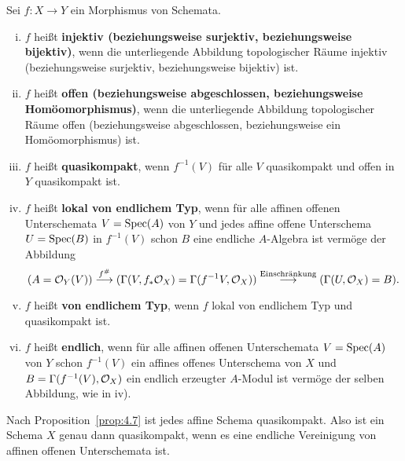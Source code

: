 \begin{defn}
\label{defn:6.8}
	Sei $f\colon X \to Y$ ein Morphismus von Schemata.
	\begin{enumerate}[i)]
		\item $f$ heißt \textbf{injektiv (beziehungsweise surjektiv, beziehungsweise bijektiv)}, wenn die unterliegende Abbildung topologischer Räume injektiv (beziehungsweise surjektiv, beziehungsweise bijektiv) ist.
		\item $f$ heißt \textbf{offen (beziehungsweise abgeschlossen, beziehungsweise Homöomorphismus)}, wenn die unterliegende Abbildung topologischer Räume  offen (beziehungsweise abgeschlossen, beziehungsweise ein Homöomorphismus) ist.
		\item $f$ heißt \textbf{quasikompakt}, wenn $f^{-1}(V)$ für alle $V$ quasikompakt und offen in $Y$ quasikompakt ist.
		\item $f$ heißt \textbf{lokal von endlichem Typ}, wenn für alle affinen offenen Unterschemata $V=\operatorname{Spec}(A)$ von $Y$ und jedes affine offene Unterschema $U = \operatorname{Spec}(B)$ in $f^{-1}(V)$ schon $B$ eine endliche $A$-Algebra ist vermöge der Abbildung
		\[
			(A = \mathcal{O}_{Y}(V))\overset{f^{\#}}{\longrightarrow}(\Gamma(V,f_*\mathcal{O}_X)=\Gamma(f^{-1}V,\mathcal{O}_X))\overset{\text{Einschränkung}}{\longrightarrow}(\Gamma(U,\mathcal{O}_X) = B).
		\]
		\item $f$ heißt \textbf{von endlichem Typ}, wenn $f$ lokal von endlichem Typ und quasikompakt ist.
		\item $f$ heißt \textbf{endlich}, wenn für alle affinen offenen Unterschemata $V = \operatorname{Spec}(A)$ von $Y$ schon $f^{-1}(V)$ ein affines offenes Unterschema von $X$ und $B = \Gamma(f^{-1}(V),\mathcal{O}_X)$ ein endlich erzeugter $A$-Modul ist vermöge der selben Abbildung, wie in iv).
	\end{enumerate}
\end{defn}

\begin{bem}
\label{bem:6.9}
	Nach Proposition~\ref{prop:4.7} ist jedes affine Schema quasikompakt. Also ist ein Schema $X$ genau dann quasikompakt, wenn es eine endliche Vereinigung von affinen offenen Unterschemata ist.
\end{bem}

